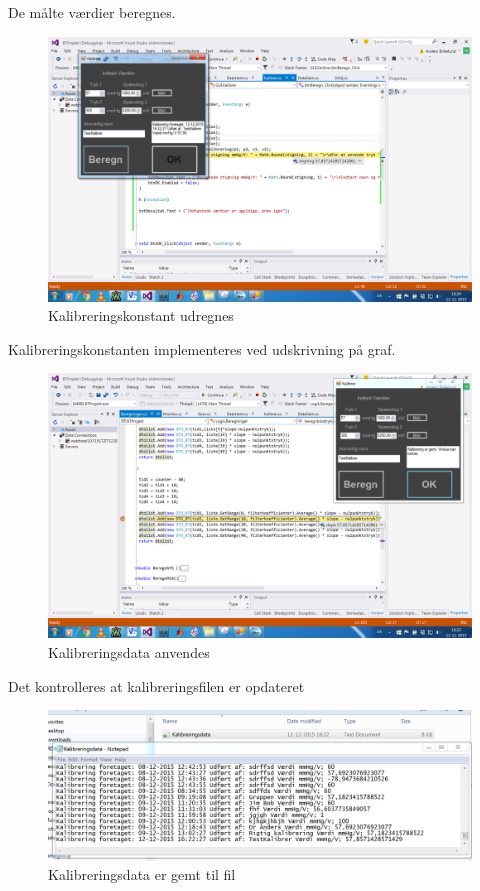 De målte værdier beregnes.

\begin{figure}[H]
	\centering
	\includegraphics[width=1\textwidth]{Figurer/Test_Kalibrer_2}
	\caption{Kalibreringskonstant udregnes}
\end{figure}

Kalibreringskonstanten implementeres ved udskrivning på graf.
\begin{figure}[H]
	\centering
	\includegraphics[width=1\textwidth]{Figurer/Test_Kalibrer_3}
	\caption{Kalibreringsdata anvendes}
\end{figure}
Det kontrolleres at kalibreringsfilen er opdateret
\begin{figure}[H]
	\centering
	\includegraphics[width=1\textwidth]{Figurer/Test_Kalibrer_4}
	\caption{Kalibreringsdata er gemt til fil}
\end{figure}

